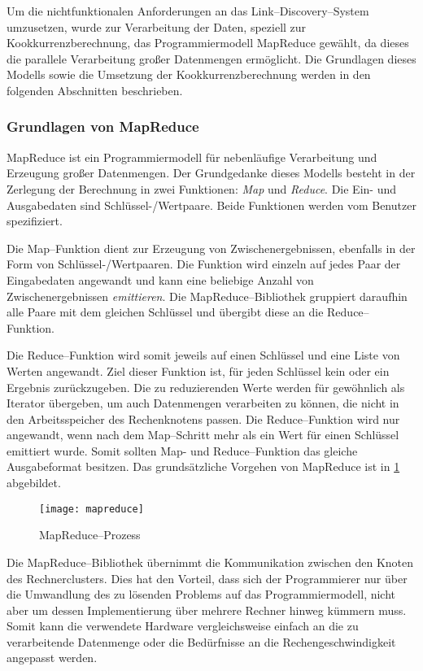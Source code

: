 Um die nichtfunktionalen Anforderungen an das Link--Discovery--System umzusetzen, wurde zur Verarbeitung der Daten, speziell zur Kookkurrenzberechnung, das Programmiermodell MapReduce gewählt, da dieses die parallele Verarbeitung großer Datenmengen ermöglicht. Die Grundlagen dieses Modells sowie die Umsetzung der Kookkurrenzberechnung werden in den folgenden Abschnitten beschrieben.

\subsubsection{Grundlagen von MapReduce}
\label{mapreduce_basic}

MapReduce \cite{dg2004} ist ein Programmiermodell für nebenläufige Verarbeitung und Erzeugung großer Datenmengen. Der Grundgedanke dieses Modells besteht in der Zerlegung der Berechnung in zwei Funktionen: \emph{Map} und \emph{Reduce}. Die Ein- und Ausgabedaten sind Schlüssel-/Wertpaare. Beide Funktionen werden vom Benutzer spezifiziert.

Die Map--Funktion dient zur Erzeugung von Zwischenergebnissen, ebenfalls in der Form von Schlüssel-/Wertpaaren. Die Funktion wird einzeln auf jedes Paar der Eingabedaten angewandt und kann eine beliebige Anzahl von Zwischenergebnissen \emph{emittieren}. Die MapReduce--Bibliothek gruppiert daraufhin alle Paare mit dem gleichen Schlüssel und übergibt diese an die Reduce--Funktion.

Die Reduce--Funktion wird somit jeweils auf einen Schlüssel und eine Liste von Werten angewandt. Ziel dieser Funktion ist, für jeden Schlüssel kein oder ein Ergebnis zurückzugeben. Die zu reduzierenden Werte werden für gewöhnlich als Iterator übergeben, um auch Datenmengen verarbeiten zu können, die nicht in den Arbeitsspeicher des Rechenknotens passen. Die Reduce--Funktion wird nur angewandt, wenn nach dem Map--Schritt mehr als ein Wert für einen Schlüssel emittiert wurde. Somit sollten Map- und Reduce--Funktion das gleiche Ausgabeformat besitzen. Das grundsätzliche Vorgehen von MapReduce ist in \cref{fig:mapreduce} abgebildet.

\begin{figure}
\centering
\texttt{[image: mapreduce]}
\caption{MapReduce--Prozess}
\label{fig:mapreduce}
\end{figure}

Die MapReduce--Bibliothek übernimmt die Kommunikation zwischen den Knoten des Rechnerclusters. Dies hat den Vorteil, dass sich der Programmierer nur über die Umwandlung des zu lösenden Problems auf das Programmiermodell, nicht aber um dessen Implementierung über mehrere Rechner hinweg kümmern muss. Somit kann die verwendete Hardware vergleichsweise einfach an die zu verarbeitende Datenmenge oder die Bedürfnisse an die Rechengeschwindigkeit angepasst werden.

